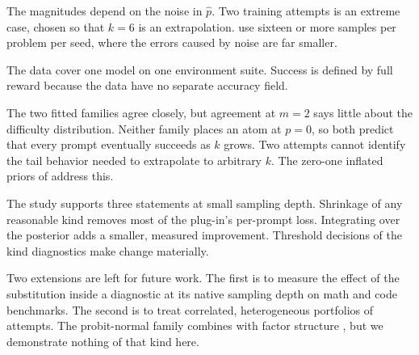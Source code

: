 \documentclass[11pt]{article}
\theoremstyle{itheads}
\begin{document}
The magnitudes depend on the noise in $\hat p$. Two training
attempts is an extreme case, chosen so that $k=6$ is an
extrapolation. \citet{malladi2026} use sixteen or more samples per
problem per seed, where the errors caused by noise are far smaller.

The data cover one model on one environment suite. Success is
defined by full reward because the data have no separate accuracy
field.

The two fitted families agree closely, but agreement at $m=2$ says
little about the difficulty distribution. Neither family places an
atom at $p=0$, so both predict that every prompt eventually succeeds
as $k$ grows. Two attempts cannot identify the tail behavior needed
to extrapolate to arbitrary $k$. The zero-one inflated priors of
\citet{verine2026} address this.

The study supports three statements at small sampling depth.
Shrinkage of any reasonable kind removes most of the plug-in's
per-prompt loss. Integrating over the posterior adds a smaller,
measured improvement. Threshold decisions of the kind diagnostics
make change materially.

Two extensions are left for future work. The first is to measure the
effect of the substitution inside a diagnostic at its native
sampling depth on math and code benchmarks. The second is to treat
correlated, heterogeneous portfolios of attempts. The probit-normal
family combines with factor structure \citep{cotton2026}, but we
demonstrate nothing of that kind here.
\end{document}
